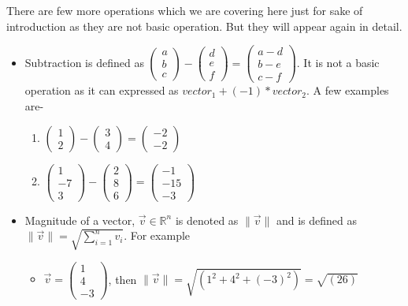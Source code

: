 \documentclass{article}
\begin{document}
There are few more operations which we are covering here just for sake of introduction as they are not basic operation. But they will appear again in detail.\\
\begin{itemize}
    \item Subtraction is defined as $\begin{pmatrix}
  a\\
  b\\
  c
 \end{pmatrix}
 -
 \begin{pmatrix}
 d\\
 e\\
 f
\end{pmatrix}
=
 \begin{pmatrix}
a-d\\
b-e\\
c-f
\end{pmatrix}$. It is not a basic operation as it can expressed as $vector_1 + (-1)* vector_2$. A few examples are-
\begin{enumerate}
    \item $\begin{pmatrix}
1\\
2
\end{pmatrix}-
 \begin{pmatrix}
3\\
4
\end{pmatrix}
=
 \begin{pmatrix}
-2\\
-2
\end{pmatrix}$\\
\item  $\begin{pmatrix}
1\\
-7\\
3
\end{pmatrix}-
\begin{pmatrix}
2\\
8\\
6
\end{pmatrix}=
\begin{pmatrix}
-1\\
-15\\
-3
\end{pmatrix}$\\
\end{enumerate}


 \item Magnitude of a vector, $\overrightarrow{v}\in\mathbb{R}^n$ is denoted as
$\|\overrightarrow{v}\|$ and  is  defined as $\|{\overrightarrow{v}\|} =  \sqrt{\sum_{i=1}^{n} {v_i}}$. For example
\begin{itemize}
    \item $\overrightarrow{v}=\begin{pmatrix}1\\4\\-3\end{pmatrix}$, then 
$\|\overrightarrow{v}\|=\sqrt{(1^2+4^2+(-3)^2)} = \sqrt{(26)}$\\


\end{itemize}
\end{itemize}
\end{document}
